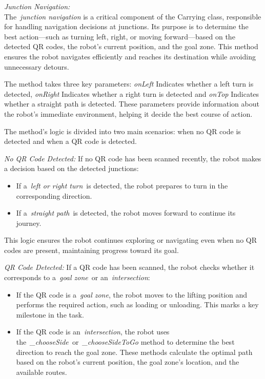 \documentclass[../../main]{subfiles}
\begin{document}
\emph{Junction Navigation:}\\
The~\emph{junction navigation} is a critical component of the Carrying
class, responsible for handling navigation decisions at junctions. Its
purpose is to determine the best action---such as turning left, right,
or moving forward---based on the detected QR codes, the robot's current
position, and the goal zone. This method ensures the robot navigates
efficiently and reaches its destination while avoiding unnecessary
detours.

The method takes three key parameters: \emph{onLeft} Indicates whether a
left turn is detected, \emph{onRight} Indicates whether a right turn is
detected and \emph{onTop} Indicates whether a straight path is detected.
These parameters provide information about the robot's immediate
environment, helping it decide the best course of action.

The method's logic is divided into two main scenarios: when no QR code
is detected and when a QR code is detected.

\emph{No QR Code Detected:} If no QR code has been scanned recently, the
robot makes a decision based on the detected junctions:

\begin{itemize}
\item
  If a~\emph{left or right turn}~is detected, the robot prepares to turn
  in the corresponding direction.
\item
  If a~\emph{straight path}~is detected, the robot moves forward to
  continue its journey.
\end{itemize}

This logic ensures the robot continues exploring or navigating even when
no QR codes are present, maintaining progress toward its goal.

\emph{QR Code Detected:} If a QR code has been scanned, the robot checks
whether it corresponds to a~\emph{goal zone}~or an~\emph{intersection}:

\begin{itemize}
\item
  If the QR code is a~\emph{goal zone}, the robot moves to the lifting
  position and performs the required action, such as loading or
  unloading. This marks a key milestone in the task.
\item
  If the QR code is an~\emph{intersection}, the robot uses
  the~\emph{\_chooseSide~}or~\emph{\_chooseSideToGo} method to determine
  the best direction to reach the goal zone. These methods calculate the
  optimal path based on the robot's current position, the goal zone's
  location, and the available routes.
\end{itemize}
\end{document}

